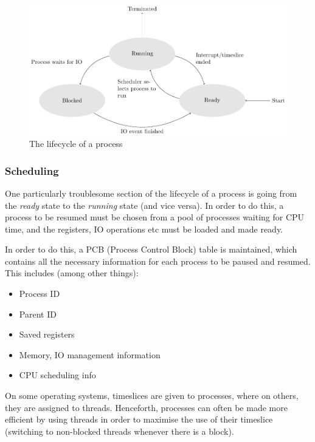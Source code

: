 \begin{figure}[ht!]
  \centering
  \includegraphics[width=\textwidth]{diagrams/process-lifecycle.pdf}
  \caption{The lifecycle of a process}
  \label{fig:proc-lifecycle}
\end{figure}

\subsubsection{Scheduling}

One particularly troublesome section of the lifecycle of a process is going from
the \textit{ready} state to the \textit{running} state (and vice versa). In
order to do this, a process to be resumed must be chosen from a pool of
processes waiting for CPU time, and the registers, IO operations etc must be
loaded and made ready.

In order to do this, a PCB (Process Control Block) table is maintained, which
contains all the necessary information for each process to be paused and
resumed. This includes (among other things):

\begin{itemize}
  \item Process ID
  \item Parent ID
  \item Saved registers
  \item Memory, IO management information
  \item CPU scheduling info
\end{itemize}

On some operating systems, timeslices are given to processes, where on others,
they are assigned to threads. Henceforth, processes can often be made more
efficient by using threads in order to maximise the use of their timeslice
(switching to non-blocked threads whenever there is a block).

